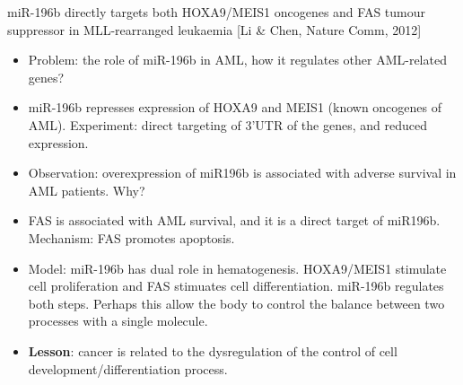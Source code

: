 \documentclass{report}
\begin{document}
miR-196b directly targets both HOXA9/MEIS1 oncogenes and FAS tumour suppressor in MLL-rearranged leukaemia [Li \& Chen, Nature Comm, 2012]
\begin{itemize}
	\item Problem: the role of miR-196b in AML, how it regulates other AML-related genes? 
	
	\item miR-196b represses expression of HOXA9 and MEIS1 (known oncogenes of AML). Experiment: direct targeting of 3'UTR of the genes, and reduced expression. 
	
	\item Observation: overexpression of miR196b is associated with adverse survival in AML patients. Why? 
	
	\item FAS is associated with AML survival, and it is a direct target of miR196b. Mechanism: FAS promotes apoptosis. 
	\item Model: miR-196b has dual role in hematogenesis. HOXA9/MEIS1 stimulate cell proliferation and FAS stimuates cell differentiation. miR-196b regulates both steps. Perhaps this allow the body to control the balance between two processes with a single molecule. 
	
	\item \textbf{Lesson}: cancer is related to the dysregulation of the control of cell development/differentiation process. 
\end{itemize}
\end{document}

